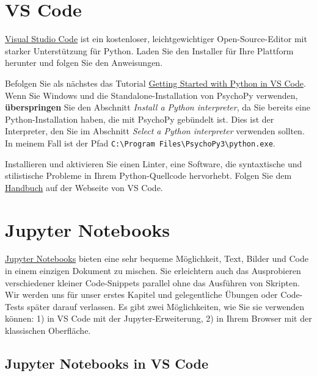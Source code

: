 \documentclass[
]{book}
\begin{document}
\hypertarget{install-vs-code}{%
\section{VS Code}\label{install-vs-code}}

\href{https://code.visualstudio.com/}{Visual Studio Code} ist ein kostenloser, leichtgewichtiger Open-Source-Editor mit starker Unterstützung für Python. Laden Sie den Installer für Ihre Plattform herunter und folgen Sie den Anweisungen.

Befolgen Sie als nächstes das Tutorial \href{https://code.visualstudio.com/docs/python/python-tutorial}{Getting Started with Python in VS Code}. Wenn Sie Windows und die Standalone-Installation von PsychoPy verwenden, \textbf{überspringen} Sie den Abschnitt \emph{Install a Python interpreter}, da Sie bereits eine Python-Installation haben, die mit PsychoPy gebündelt ist. Dies ist der Interpreter, den Sie im Abschnitt \emph{Select a Python interpreter} verwenden sollten. In meinem Fall ist der Pfad \texttt{C:\textbackslash{}Program\ Files\textbackslash{}PsychoPy3\textbackslash{}python.exe}.

Installieren und aktivieren Sie einen Linter, eine Software, die syntaxtische und stilistische Probleme in Ihrem Python-Quellcode hervorhebt. Folgen Sie dem \href{https://code.visualstudio.com/docs/python/linting}{Handbuch} auf der Webseite von VS Code.

\hypertarget{jupyter-notebooks}{%
\section{Jupyter Notebooks}\label{jupyter-notebooks}}

\href{https://jupyter.org/}{Jupyter Notebooks} bieten eine sehr bequeme Möglichkeit, Text, Bilder und Code in einem einzigen Dokument zu mischen. Sie erleichtern auch das Ausprobieren verschiedener kleiner Code-Snippets parallel ohne das Ausführen von Skripten. Wir werden uns für unser erstes Kapitel und gelegentliche Übungen oder Code-Tests später darauf verlassen. Es gibt zwei Möglichkeiten, wie Sie sie verwenden können: 1) in VS Code mit der Jupyter-Erweiterung, 2) in Ihrem Browser mit der klassischen Oberfläche.

\hypertarget{jupyter-notebooks-in-vs-code}{%
\subsection{Jupyter Notebooks in VS Code}\label{jupyter-notebooks-in-vs-code}}
\end{document}
